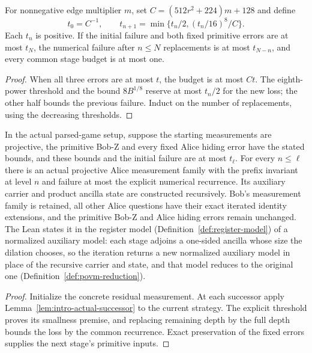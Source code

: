 \begin{lemma}
\label{lem:intro-iteration-threshold}
\leanok
For nonnegative edge multiplier $m$, set
$C=(512r^2+224)m+128$ and define
\[
  t_0=C^{-1},\qquad
  t_{n+1}=\min\{t_n/2,(t_n/16)^8/C\}.
\]
Each $t_n$ is positive. If the initial failure and both fixed primitive
errors are at most $t_N$, the numerical failure after $n\leq N$ replacements
is at most $t_{N-n}$, and every common stage budget is at most one.
\end{lemma}
\begin{proof}
\leanok
When all three errors are at most $t$, the budget is at most $Ct$.
The eighth-power threshold and the bound $8B^{1/8}$ reserve at most
$t_n/2$ for the new loss; the other half bounds the previous failure.
Induct on the number of replacements, using the decreasing thresholds.
\end{proof}

\begin{lemma}
\label{lem:intro-actual-iteration}
\leanok
In the actual parsed-game setup, suppose the starting measurements are
projective, the primitive Bob-Z and every fixed Alice hiding error have the
stated bounds, and these bounds and the initial failure are at most $t_\ell$.
For every $n\leq\ell$ there is an actual projective Alice measurement family
with the prefix invariant at level $n$ and failure at most the explicit
numerical recurrence. Its auxiliary carrier and product ancilla state are
constructed recursively. Bob's measurement family is retained, all other
Alice questions have their exact iterated identity extensions, and the
primitive Bob-Z and Alice hiding errors remain unchanged.
The Lean states it in the register model (Definition~\ref{def:register-model}) of a normalized
auxiliary model: each stage adjoins a one-sided ancilla whose size the dilation chooses, so the
iteration returns a new normalized auxiliary model in place of the recursive carrier and state, and
that model reduces to the original one (Definition~\ref{def:povm-reduction}).
\end{lemma}
\begin{proof}
\leanok
Initialize the concrete residual measurement. At each successor apply
Lemma~\ref{lem:intro-actual-successor} to the current strategy. The explicit
threshold proves its smallness premise, and replacing remaining depth by
the full depth bounds the loss by the common recurrence. Exact preservation
of the fixed errors supplies the next stage's primitive inputs.
\end{proof}

